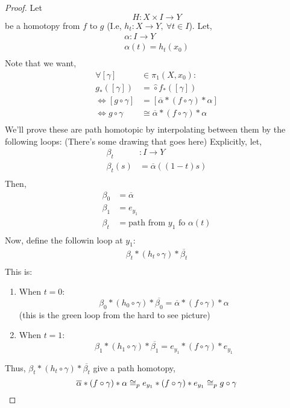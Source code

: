\documentclass[../notes.tex]{subfiles}
\begin{document}
    \begin{proof}
        Let
        \[
            H:X\times I \rightarrow Y
        \]
        be a homotopy from $f$ to $g$ (I.e, $h_t:X \rightarrow Y,\ \forall t\in I$).
        Let,
        \begin{align*}
            \alpha: I \rightarrow Y\\
            \alpha(t)=h_t(x_0)\\
        \end{align*}
        Note that we want,
        \begin{align*}
            \forall [\gamma] &\in \pi_1(X,x_0):\\
            g_*([\gamma])&=\hat\circ f_*([\gamma])\\
            \iff [g\circ \gamma]&=[\overline{\alpha}*(f\circ \gamma)*\alpha]\\
            \iff g\circ \gamma&\cong \overline{\alpha}*(f\circ \gamma)*\alpha\\
        \end{align*}
        We'll prove these are path homotopic by interpolating between them by the following
        loops: (There's some drawing that goes here)
        Explicitly, let,
        \begin{align*}
            \beta_{t}&: I \rightarrow Y\\
            \beta_{t}(s)&=\overline{\alpha}((1-t)s)\\
        \end{align*}
        Then,
        \begin{align*}
            \beta_{0}&=\overline{\alpha}\\
            \beta_{1}&=e_{y_1}\\
            \beta_{t}&=\text{path from $y_1$ fo $\alpha(t)$}\\
        \end{align*}
        Now, define the followin loop at $y_1$:
        \begin{align*}
            \beta_{t}*(h_t\circ \gamma)* \overline{\beta_{t}}\\
        \end{align*}
        This is:
        \begin{enumerate}
            \item When $t=0$:
                \[
                    \beta_{0}*(h_0\circ \gamma)*\overline{\beta_0}
                    =\overline{\alpha}*(f\circ \gamma)*\alpha
                \]
                (this is the green loop from the hard to see picture)
            \item When $t=1$:
                \[
                    \beta_{1}*(h_1\circ \gamma)*\overline{\beta_1}
                    =e_{y_{1}}*(f\circ \gamma)*e_{y_{1}}
                \]
        \end{enumerate}
        Thus, $\beta_{t}*(h_t\circ \gamma)*\overline{\beta_t}$ give a path homotopy,
        \[
                    \overline{\alpha}*(f\circ \gamma)*\alpha
                    \cong_p e_{y_{1}}*(f\circ \gamma)*e_{y_{1}}
                    \cong_p g \circ \gamma\\
        \]
    \end{proof}
\end{document}
